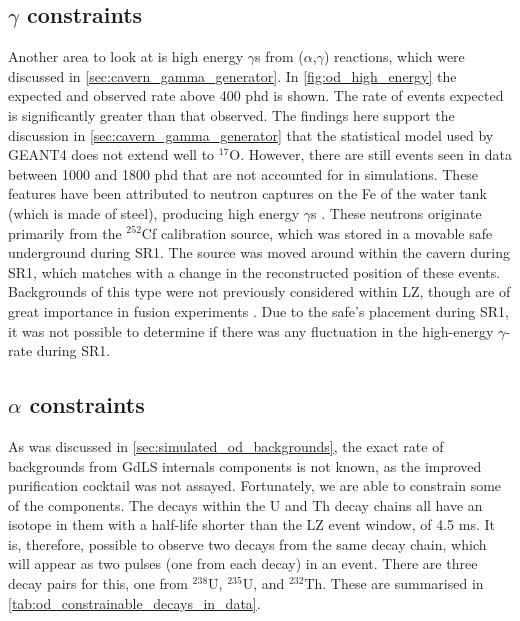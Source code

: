 \subsection{$\gamma$ constraints}
\par
Another area to look at is high energy $\gamma$s from ($\alpha$,$\gamma$) reactions, which were discussed in \autoref{sec:cavern_gamma_generator}.
In \autoref{fig:od_high_energy} the expected and observed rate above 400 phd is shown.
The rate of events expected is significantly greater than that observed.
The findings here support the discussion in \autoref{sec:cavern_gamma_generator} that the statistical model used by GEANT4 does not extend well to ${}^{17}$O.
However, there are still events seen in data between 1000 and 1800 phd that are not accounted for in simulations.
These features have been attributed to neutron captures on the Fe of the water tank (which is made of steel), producing high energy $\gamma$s \cite{iron_neutrons_ref}.
These neutrons originate primarily from the ${}^{252}$Cf calibration source, which was stored in a movable safe underground during SR1.
The source was moved around within the cavern during SR1, which matches with a change in the reconstructed position of these events.
Backgrounds of this type were not previously considered within LZ, though are of great importance in fusion experiments \cite{iter_neutrons_ref}.
Due to the safe's placement during SR1, it was not possible to determine if there was any fluctuation in the high-energy $\gamma$-rate during SR1.



\subsection{$\alpha$ constraints}
\par
As was discussed in \autoref{sec:simulated_od_backgrounds}, the exact rate of backgrounds from GdLS internals components is not known, as the improved purification cocktail was not assayed.
Fortunately, we are able to constrain some of the components. 
The decays within the U and Th decay chains all have an isotope in them with a half-life shorter than the LZ event window, of 4.5 ms.
It is, therefore, possible to observe two decays from the same decay chain, which will appear as two pulses (one from each decay) in an event.
There are three decay pairs for this, one from ${}^{238}$U, ${}^{235}$U, and ${}^{232}$Th.
These are summarised in \autoref{tab:od_constrainable_decays_in_data}.

